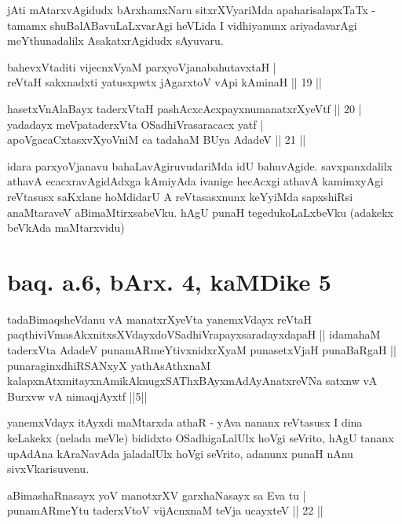 \begin{artha}
jAti mAtarxvAgidudx bArxhamxNaru sitxrXVyariMda apaharisalapxTaTx - 
tamamx shuBalABavuLaLxvarAgi heVLida I vidhiyanunx ariyadavarAgi 
meYthunadalilx AsakatxrAgidudx sAyuvaru.
\end{artha}

\begin{shl}
bahevxVtaditi vijecnxVyaM parxyoVjanabahutavxtaH | \\
reVtaH sakxnadxti yatusxpwtx jAgarxtoV vA\s pi kAminaH \hfill|| 19 || 
\end{shl}

\begin{shl}
hasetxVnA\s \s laBayx taderxVtaH pashAcxcAcxpayxnumanatxrXyeVtf \hfill|| 20 | \\
yadadayx meV\s pataderxVta OSadhiVrasaracacx yatf | \\
apoV\s gacaCxtasxvXyoVniM ca tadahaM BUya AdadeV \hfill|| 21 || 
\end{shl}

\begin{artha}
idara parxyoVjanavu bahaLavAgiruvudariMda idU bahuvAgide. 
savxpanxdalilx athavA ecacxravAgidAdxga kAmiyAda ivanige hecAcxgi 
athavA kamimxyAgi reVtasusx saKxlane hoMdidarU A reVtasasxnunx 
keYyiMda sapxshiRsi anaMtaraveV aBimaMtirxsabeVku. hAgU punaH 
tegedukoLaLxbeVku (adakekx beVkAda maMtarxvidu)
\end{artha}

\section*{baq. a.6, bArx. 4, kaMDike 5}

\begin{shl}
tadaBimaqsheVdanu vA manatxrXyeVta yanemxV\s dayx reVtaH paqthiviVmasAkxnitxsXVdayxdoVSadhiVrapayxsaradayxdapaH || idamahaM taderxVta AdadeV punamARmeYtivxnidxrXyaM punasetxVjaH punaBaRgaH || punaraginxdhiRSANxyX yathAsAthxnaM kalapxnAtxmitayxnAmikAknugxSAThxBAyxmAdAyAnatxreVNa satxnw vA Burxvw vA nimaqjAyxtf ||5||
\end{shl}

\begin{artha}
yanemxVdayx itAyxdi maMtarxda athaR - yAva nananx reVtasusx I dina 
keLakekx (nelada meVle) bididxto OSadhigaLalUlx hoVgi seVrito, hAgU 
tananx upAdAna kAraNavAda jaladalUlx hoVgi seVrito, adanunx punaH nAnu 
sivxVkarisuvenu.
\end{artha}

\begin{shl}
aBimashaRnasayx yoV manotxrXV garxhaNasayx sa Eva tu | \\
punamARmeYtu taderxVtoV vijAcnxnaM teVja ucayxteV \hfill|| 22 || 
\end{shl}


